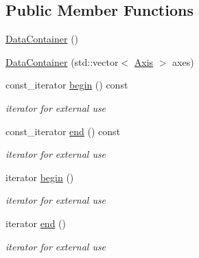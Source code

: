 \subsection*{Public Member Functions}
\begin{DoxyCompactItemize}
\item 
\mbox{\hyperlink{classQn_1_1DataContainer_a5443239806a27f42e502c88d6f76328e}{Data\+Container}} ()
\item 
\mbox{\hyperlink{classQn_1_1DataContainer_a1f171432b577b5d0061908d461c39198}{Data\+Container}} (std\+::vector$<$ \mbox{\hyperlink{classQn_1_1Axis}{Axis}} $>$ axes)
\item 
\mbox{\label{classQn_1_1DataContainer_a92dd60f02cc0f05d0c06ca95d68b3551}} 
const\+\_\+iterator \mbox{\hyperlink{classQn_1_1DataContainer_a92dd60f02cc0f05d0c06ca95d68b3551}{begin}} () const
\begin{DoxyCompactList}\small\item\em iterator for external use \end{DoxyCompactList}\item 
\mbox{\label{classQn_1_1DataContainer_a8ea9e17c117d88252bee513bed2208b6}} 
const\+\_\+iterator \mbox{\hyperlink{classQn_1_1DataContainer_a8ea9e17c117d88252bee513bed2208b6}{end}} () const
\begin{DoxyCompactList}\small\item\em iterator for external use \end{DoxyCompactList}\item 
\mbox{\label{classQn_1_1DataContainer_ad9d4fa0d39d72c3e5cbf527c9b462322}} 
iterator \mbox{\hyperlink{classQn_1_1DataContainer_ad9d4fa0d39d72c3e5cbf527c9b462322}{begin}} ()
\begin{DoxyCompactList}\small\item\em iterator for external use \end{DoxyCompactList}\item 
\mbox{\label{classQn_1_1DataContainer_aaab2056ff13b5342a5dc9a94ca6e9141}} 
iterator \mbox{\hyperlink{classQn_1_1DataContainer_aaab2056ff13b5342a5dc9a94ca6e9141}{end}} ()
\begin{DoxyCompactList}\small\item\em iterator for external use \end{DoxyCompactList}\item 

\end{DoxyCompactItemize}
